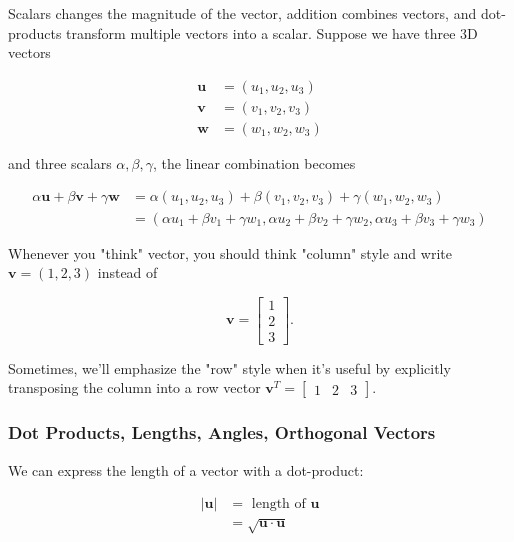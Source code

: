 \documentclass[main.tex]{subfiles}
\begin{document}
    Scalars changes the magnitude of the vector, addition combines vectors, and dot-products transform multiple vectors into a scalar. Suppose we have three 3D vectors 
    
    $$\begin{aligned} \mathbf{u} &=\left(u_{1}, u_{2}, u_{3}\right) \\ \mathbf{v} &=\left(v_{1}, v_{2}, v_{3}\right) \\ \mathbf{w} &=\left(w_{1}, w_{2}, w_{3}\right) \end{aligned}$$
    
    and three scalars $\alpha, \beta, \gamma$, the linear combination becomes
    
    $$\begin{aligned} \alpha \mathbf{u}+\beta \mathbf{v}+\gamma \mathbf{w} &=\alpha\left(u_{1}, u_{2}, u_{3}\right)+\beta\left(v_{1}, v_{2}, v_{3}\right)+\gamma\left(w_{1}, w_{2}, w_{3}\right) \\ &=\left(\alpha u_{1}+\beta v_{1}+\gamma w_{1}, \alpha u_{2}+\beta v_{2}+\gamma w_{2}, \alpha u_{3}+\beta v_{3}+\gamma w_{3}\right) \end{aligned}$$
    
    Whenever you "think" vector, you should think "column" style and write $\mathbf{v}=(1,2,3)$ instead of 
    
    $$\mathbf{v}=\left[\begin{array}{l}1 \\ 2 \\ 3\end{array}\right].$$
    
    Sometimes, we'll emphasize the "row" style when it's useful by explicitly transposing the column into a row vector $\mathbf{v}^{T}=\left[\begin{array}{lll}1 & 2 & 3\end{array}\right]$.
    
    \subsubsection{Dot Products, Lengths, Angles, Orthogonal Vectors}
    
    We can express the length of a vector with a dot-product:
    
    $$\begin{aligned}|\mathbf{u}| &=\text { length of } \mathbf{u} \\ &=\sqrt{\mathbf{u} \cdot \mathbf{u}} \end{aligned}$$
    
\end{document}
